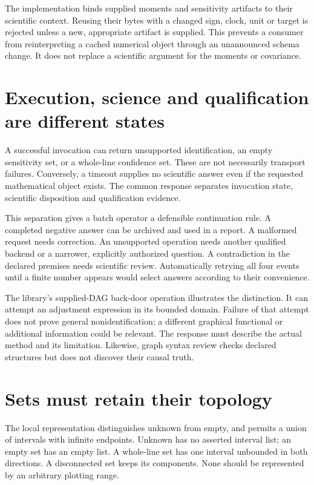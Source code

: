The implementation binds supplied moments and sensitivity artifacts to their
scientific context. Reusing their bytes with a changed sign, clock, unit or
target is rejected unless a new, appropriate artifact is supplied. This
prevents a consumer from reinterpreting a cached numerical object through an
unannounced schema change. It does not replace a scientific argument for the
moments or covariance. \cite{v12_in_runtime}

\section{Execution, science and qualification are different states}

A successful invocation can return unsupported identification, an empty
sensitivity set, or a whole-line confidence set. These are not necessarily
transport failures. Conversely, a timeout supplies no scientific answer even
if the requested mathematical object exists. The common response separates
invocation state, scientific disposition and qualification evidence.

This separation gives a batch operator a defensible continuation rule. A
completed negative answer can be archived and used in a report. A malformed
request needs correction. An unsupported operation needs another qualified
backend or a narrower, explicitly authorized question. A contradiction in the
declared premises needs scientific review. Automatically retrying all four
events until a finite number appears would select answers according to their
convenience.

The library's supplied-DAG back-door operation illustrates the distinction.
It can attempt an adjustment expression in its bounded domain. Failure of
that attempt does not prove general nonidentification; a different graphical
functional or additional information could be relevant. The response must
describe the actual method and its limitation. Likewise, graph syntax review
checks declared structures but does not discover their causal truth.
\cite{v12_in_runtime}

\section{Sets must retain their topology}

The local representation distinguishes unknown from empty, and permits a union
of intervals with infinite endpoints. Unknown has no asserted interval list;
an empty set has an empty list. A whole-line set has one interval unbounded in
both directions. A disconnected set keeps its components. \cite{v12_in_contract}
None should be represented by an arbitrary plotting range.

